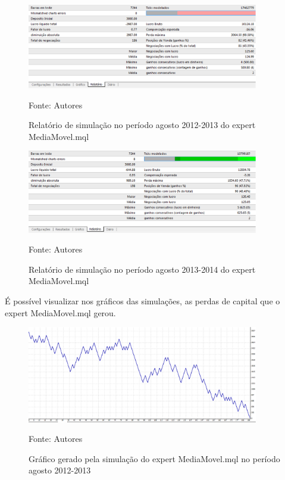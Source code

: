 \begin{figure}[htp]
\centering
\includegraphics[width=0.9\textwidth]{figuras/protocoloMedia}
\caption{Relatório de simulação no período agosto 2012-2013 do expert MediaMovel.mql}{Fonte: Autores} 
\label{protocoloMedia}
\end{figure}

\begin{figure}[htp]
\centering
\includegraphics[width=0.9\textwidth]{figuras/protocoloMedia2}
\caption{Relatório de simulação no período agosto 2013-2014 do expert MediaMovel.mql}{Fonte: Autores} 
\label{protocoloMedia2}
\end{figure}

É possível visualizar nos gráficos das simulações, as perdas de capital que o expert MediaMovel.mql gerou.

\begin{figure}[htp]
\centering
\includegraphics[width=0.9\textwidth]{figuras/protocoloMedia3}
\caption{ Gráfico gerado pela simulação do expert MediaMovel.mql no período agosto 2012-2013}{Fonte: Autores} 
\label{protocoloMedia3}
\end{figure}

